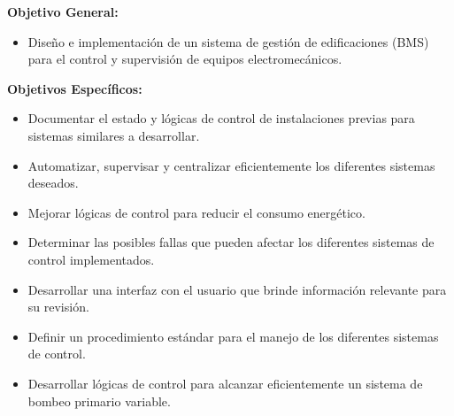 \textbf{Objetivo General:}

\begin{itemize}
    \item Diseño e implementación de un sistema de gestión de edificaciones (BMS) para el control y supervisión de equipos electromecánicos.
\end{itemize}

\textbf{Objetivos Específicos:}

\begin{itemize}
    \item Documentar el estado y lógicas de control de instalaciones previas para sistemas similares a desarrollar.
    \item Automatizar, supervisar y centralizar eficientemente los diferentes sistemas deseados.
    \item Mejorar lógicas de control para reducir el consumo energético. 
    \item Determinar las posibles fallas que pueden afectar los diferentes sistemas de control implementados.
    \item Desarrollar una interfaz con el usuario que brinde información relevante para su revisión.
    \item Definir un procedimiento estándar para el manejo de los diferentes sistemas de control.
    \item Desarrollar lógicas de control para alcanzar eficientemente un sistema de bombeo primario variable. 
\end{itemize}

